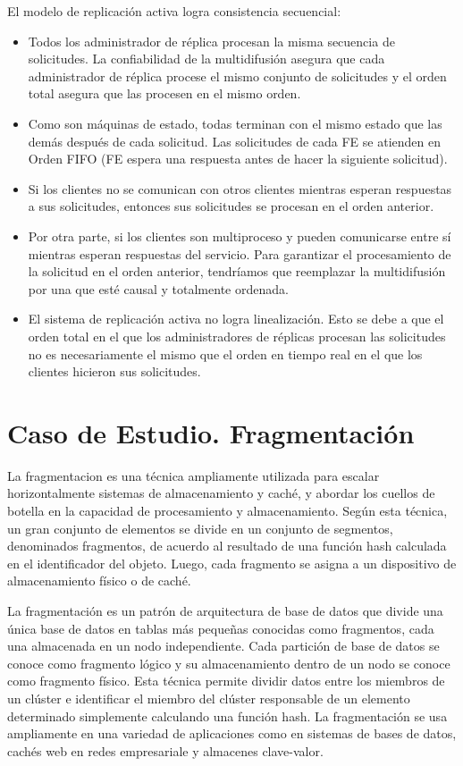  El modelo de replicaci\'on activa logra consistencia secuencial:
 \begin{itemize}
 	\item Todos los administrador de réplica  procesan la misma secuencia de solicitudes. La confiabilidad de la multidifusión asegura que cada administrador de réplica  procese el mismo conjunto de solicitudes y el orden total asegura que las procesen en el mismo orden.
 	\item  	Como son máquinas de estado, todas terminan con el mismo estado que las demás después de cada solicitud. Las solicitudes de cada FE se atienden en Orden FIFO (FE espera una respuesta antes de hacer la siguiente solicitud).
 	\item Si los clientes no se comunican con otros clientes mientras esperan respuestas a sus solicitudes, entonces sus solicitudes se procesan en el orden anterior.  
 	\item Por otra parte, si los clientes son multiproceso y pueden comunicarse entre sí mientras esperan respuestas del servicio. Para garantizar el procesamiento de la solicitud en el orden anterior, tendríamos que reemplazar la multidifusión por una que esté causal y totalmente ordenada. 
 	\item El sistema de replicación activa no logra linealización. Esto se debe a que el orden total en el que los administradores de réplicas procesan las solicitudes no es necesariamente el mismo que el orden en tiempo real en el que los clientes hicieron sus solicitudes.
 \end{itemize}
 
 \section{Caso de Estudio. Fragmentación}
   
  
 La \gls{fragmentacion}   es una técnica ampliamente utilizada para escalar horizontalmente  sistemas de almacenamiento y caché, y abordar los cuellos de botella en la capacidad de procesamiento y almacenamiento. Según esta técnica, un gran conjunto de elementos se divide en un conjunto de segmentos, denominados fragmentos,  de acuerdo  al resultado de una función hash calculada en  el identificador del objeto. Luego, cada fragmento se asigna a un dispositivo de almacenamiento físico o de caché. 
 
 La fragmentación es un patrón de arquitectura de base de datos  que divide una única base de datos en tablas más pequeñas conocidas como fragmentos, cada una almacenada en un nodo independiente. Cada partición de base de datos se conoce como fragmento lógico y su almacenamiento dentro de un nodo se conoce como fragmento físico.
 Esta técnica  permite dividir datos entre los miembros de un clúster e identificar el miembro del clúster responsable de un elemento determinado simplemente calculando una función hash. La fragmentación se usa ampliamente en una variedad de aplicaciones como  en sistemas de bases de datos, cachés web en redes empresariale  y almacenes  clave-valor.  
 
